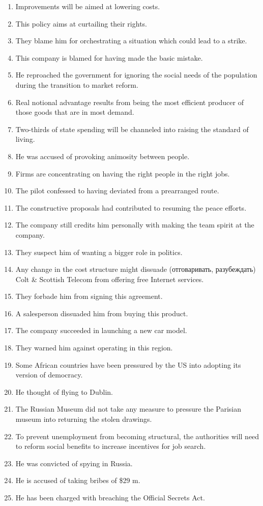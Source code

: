 \documentclass[main.tex]{subfiles}
\begin{document}
\begin{enumerate}[nosep,leftmargin=*]
	\itemsep\eitsp
	\item Improvements will be aimed at lowering costs.
	\item This policy aims at curtailing their rights.
	\item They blame him for orchestrating a situation which could lead to a strike.
	\item This company is blamed for having made the basic mistake.
	\item He reproached the government for ignoring the social needs of the population during the transition to market reform.
	\item Real notional advantage results from being the most efficient producer of those goods that are in most demand.
	\item Two-thirds of state spending will be channeled into raising the standard of living.
	\item He was accused of provoking animosity between people.
	\item Firms are concentrating on having the right people in the right jobs.
	\item The pilot confessed to having deviated from a prearranged route.
	\item The constructive proposals had contributed to resuming the peace efforts.
	\item The company still credits him personally with making the team spirit at the company.
	\item They suspect him of wanting a bigger role in politics.
	\item Any change in the cost structure might dissuade (отговаривать, разубеждать) Colt \& Scottish Telecom from offering free Internet services.
	\item They forbade him from signing this agreement.
	\item A salesperson dissuaded him from buying this product.
	\item The company succeeded in launching a new car model.
	\item They warned him against operating in this region.
	\item Some African countries have been pressured by the US into adopting its version of democracy.
	\item He thought of flying to Dublin.
	\item The Russian Museum did not take any measure to pressure the Parisian museum into returning the stolen drawings.
	\item To prevent unemployment from becoming structural, the authorities will need to reform social benefits to increase incentives for job search.
	\item He was convicted of spying in Russia.
	\item He is accused of taking bribes of \$29 m.
	\item He has been charged with breaching the Official Secrets Act.
\end{enumerate}
\end{document}
